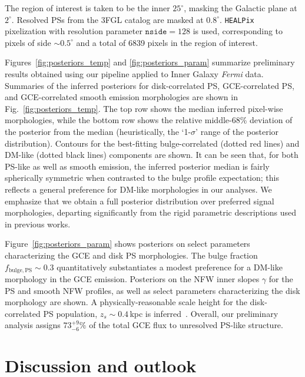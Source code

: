 \documentclass{article}
\theoremstyle{plain}
\theoremstyle{definition}
\theoremstyle{remark}
\newcommand{\Fermi} {\emph{Fermi}\xspace}
\begin{document}
The region of interest is taken to be the inner $25^\circ$, masking the Galactic plane at $2^\circ$. Resolved PSs from the 3FGL catalog are masked at $0.8^\circ$. \texttt{HEALPix}~\cite{Gorski:2004by} pixelization with resolution parameter $\texttt{nside}=128$ is used, corresponding to pixels of side $\sim0.5^\circ$ and a total of 6839 pixels in the region of interest.

Figures~\ref{fig:posteriors_temp} and \ref{fig:posteriors_param} summarize preliminary results obtained using our pipeline applied to Inner Galaxy \Fermi data. Summaries of the inferred posteriors for disk-correlated PS, GCE-correlated PS, and GCE-correlated smooth emission morphologies are shown in Fig.~\ref{fig:posteriors_temp}. The top row shows the median inferred pixel-wise morphologies, while the bottom row shows the relative middle-68\% deviation of the posterior from the median (heuristically, the `1-$\sigma$' range of the posterior distribution). Contours for the best-fitting bulge-correlated (dotted red lines) and DM-like (dotted black lines) components are shown. It can be seen that, for both PS-like as well as smooth emission, the inferred posterior median is fairly spherically symmetric when contrasted to the bulge profile expectation; this reflects a general preference for DM-like morphologies in our analyses. We emphasize that we obtain a full posterior distribution over preferred signal morphologies, departing significantly from the rigid parametric descriptions used in previous works.

Figure~\ref{fig:posteriors_param} shows posteriors on select parameters characterizing the GCE and disk PS morphologies. The bulge fraction $f_\mathrm{bulge, PS}\sim 0.3$ quantitatively substantiates a modest preference for a DM-like morphology in the GCE emission. Posteriors on the NFW inner slopes $\gamma$ for the PS and smooth NFW profiles, as well as select parameters characterizing the disk morphology are shown. A physically-reasonable scale height for the disk-correlated PS population, $z_s\sim 0.4$\,kpc is inferred~\cite{bartels2018bayesian}. Overall, our preliminary analysis assigns $73^{+9}_{-6}\%$ of the total GCE flux to unresolved PS-like structure.

\section{Discussion and outlook} 
\end{document}
